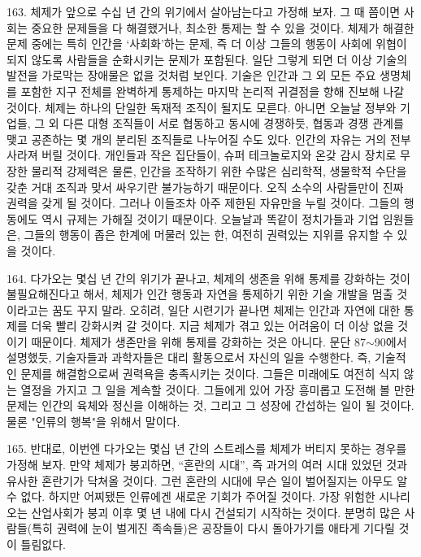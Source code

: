 \documentclass[11pt,a4paper]{article}
\begin{document}
\begin{multicols}{2}
163. 체제가 앞으로 수십 년 간의 위기에서 살아남는다고 가정해 보자. 그 때 쯤이면 사회는 중요한  문제들을 다 해결했거나, 최소한 통제는 할 수 있을 것이다. 체제가 해결한 문제 중에는 특히 인간을 `사회화'하는 문제, 즉 더 이상 그들의 행동이 사회에 위협이 되지 않도록 사람들을 순화시키는 문제가  포함된다. 일단 그렇게 되면 더 이상 기술의 발전을 가로막는 장애물은 없을 것처럼 보인다. 기술은  인간과 그 외 모든 주요 생명체를 포함한 지구 전체를 완벽하게 통제하는 마지막 논리적 귀결점을 향해  진보해 나갈 것이다. 체제는 하나의 단일한 독재적 조직이 될지도 모른다. 아니면 오늘날 정부와 기업들,  그 외 다른 대형 조직들이 서로 협동하고 동시에 경쟁하듯, 협동과 경쟁 관계를 맺고 공존하는 몇 개의  분리된 조직들로 나누어질 수도 있다. 인간의 자유는 거의 전부 사라져 버릴 것이다. 개인들과 작은  집단들이, 슈퍼 테크놀로지와 온갖 감시 장치로 무장한 물리적 강제력은 물론, 인간을 조작하기 위한  수많은 심리학적, 생물학적 수단을 갖춘 거대 조직과 맞서 싸우기란 불가능하기 때문이다. 오직 소수의  사람들만이 진짜 권력을 갖게 될 것이다. 그러나 이들조차 아주 제한된 자유만을 누릴 것이다. 그들의  행동에도 역시 규제는 가해질 것이기 때문이다. 오늘날과 똑같이 정치가들과 기업 임원들은, 그들의  행동이 좁은 한계에 머물러 있는 한, 여전히 권력있는 지위를 유지할 수 있을 것이다.  


164. 다가오는 몇십 년 간의 위기가 끝나고, 체제의 생존을 위해 통제를 강화하는 것이 불필요해진다고  해서, 체제가 인간 행동과 자연을 통제하기 위한 기술 개발을 멈출 것이라고는 꿈도 꾸지 말라. 오히려,  일단 시련기가 끝나면 체제는 인간과 자연에 대한 통제를 더욱 빨리 강화시켜 갈 것이다. 지금 체제가  겪고 있는 어려움이 더 이상 없을 것이기 때문이다. 체제가 생존만을 위해 통제를 강화하는 것은 아니다.  문단 87${\sim}$90에서 설명했듯, 기술자들과 과학자들은 대리 활동으로서 자신의 일을 수행한다. 즉, 기술적인 문제를 해결함으로써 권력욕을 충족시키는 것이다. 그들은 미래에도 여전히 식지 않는 열정을 가지고 그  일을 계속할 것이다. 그들에게 있어 가장 흥미롭고 도전해 볼 만한 문제는 인간의 육체와 정신을 이해하는 것, 그리고 그 성장에 간섭하는 일이 될 것이다. 물론 "인류의 행복"을 위해서 말이다.  


165. 반대로, 이번엔 다가오는 몇십 년 간의 스트레스를 체제가 버티지 못하는 경우를 가정해 보자. 만약 체제가 붕괴하면, “혼란의 시대”, 즉 과거의 여러 시대 있었던 것과 유사한 혼란기가 닥쳐올 것이다. 그런  혼란의 시대에 무슨 일이 벌어질지는 아무도 알 수 없다. 하지만 어찌됐든 인류에겐 새로운 기회가 주어질 
것이다. 가장 위험한 시나리오는 산업사회가 붕괴 이후 몇 년 내에 다시 건설되기 시작하는 것이다.  분명히 많은 사람들(특히 권력에 눈이 벌게진 족속들)은 공장들이 다시 돌아가기를 애타게 기다릴 것이  틀림없다. 



\end{multicols}
\end{document}

